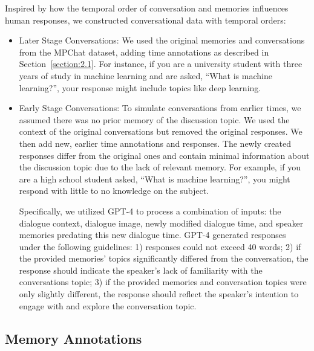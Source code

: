 Inspired by how the temporal order of conversation and memories influences human responses, we constructed conversational data with temporal orders:
\begin{itemize}
\vspace{-2mm}
\item Later Stage Conversations: We used the original memories and conversations from the MPChat dataset, adding time annotations as described in Section~\ref{section:2.1}. For instance, if you are a university student with three years of study in machine learning and are asked, ``What is machine learning?'', your response might include topics like deep learning.
\vspace{-1mm}
    \item Early Stage Conversations: To simulate conversations from earlier times, we assumed there was no prior memory of the discussion topic. We used the context of the original conversations but removed the original responses. We then add new, earlier time annotations and responses. The newly created responses differ from the original ones and contain minimal information about the discussion topic due to the lack of relevant memory. For example, if you are a high school student asked, ``What is machine learning?'', you might respond with little to no knowledge on the subject.

    Specifically, we utilized GPT-4 \cite{achiam2023gpt} to process a combination of inputs: the dialogue context, dialogue image, newly modified dialogue time, and speaker memories predating this new dialogue time. GPT-4 generated responses under the following guidelines: 1) responses could not exceed 40 words; 2) if the provided memories' topics significantly differed from the conversation, the response should indicate the speaker’s lack of familiarity with the conversations topic; 3) if the provided memories and conversation topics were only slightly different, the response should reflect the speaker's intention to engage with and explore the conversation topic.
\end{itemize}


\subsection{Memory Annotations}

